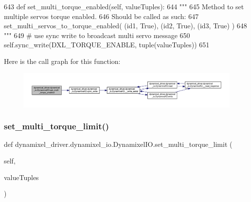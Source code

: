 \begin{DoxyCode}
643     \textcolor{keyword}{def }set\_multi\_torque\_enabled(self, valueTuples):
644         \textcolor{stringliteral}{"""}
645 \textcolor{stringliteral}{        Method to set multiple servos torque enabled.}
646 \textcolor{stringliteral}{        Should be called as such:}
647 \textcolor{stringliteral}{        set\_multi\_servos\_to\_torque\_enabled( (id1, True), (id2, True), (id3, True) )}
648 \textcolor{stringliteral}{        """}
649         \textcolor{comment}{# use sync write to broadcast multi servo message}
650         self.sync\_write(DXL\_TORQUE\_ENABLE, tuple(valueTuples))
651 
\end{DoxyCode}
Here is the call graph for this function\+:
\nopagebreak
\begin{figure}[H]
\begin{center}
\leavevmode
\includegraphics[width=350pt]{dd/d77/classdynamixel__driver_1_1dynamixel__io_1_1_dynamixel_i_o_a131a8a5ce4168f260e0661c2867155d2_cgraph}
\end{center}
\end{figure}
\mbox{\label{classdynamixel__driver_1_1dynamixel__io_1_1_dynamixel_i_o_a1e05872bf62fd6726255c423219ca569}} 
\subsubsection{\texorpdfstring{set\+\_\+multi\+\_\+torque\+\_\+limit()}{set\_multi\_torque\_limit()}}
{\footnotesize\ttfamily def dynamixel\+\_\+driver.\+dynamixel\+\_\+io.\+Dynamixel\+I\+O.\+set\+\_\+multi\+\_\+torque\+\_\+limit (\begin{DoxyParamCaption}\item[{}]{self,  }\item[{}]{value\+Tuples }\end{DoxyParamCaption})}

